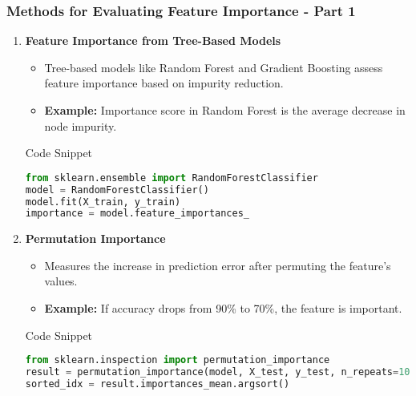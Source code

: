 \documentclass[aspectratio=169]{beamer}
\begin{document}
\begin{frame}
    \frametitle{Methods for Evaluating Feature Importance - Part 1}
    \begin{enumerate}
        \item \textbf{Feature Importance from Tree-Based Models}
        \begin{itemize}
            \item Tree-based models like Random Forest and Gradient Boosting assess feature importance based on impurity reduction.
            \item \textbf{Example:} Importance score in Random Forest is the average decrease in node impurity.
        \end{itemize}
        \begin{block}{Code Snippet}
            \begin{lstlisting}[language=Python]
from sklearn.ensemble import RandomForestClassifier
model = RandomForestClassifier()
model.fit(X_train, y_train)
importance = model.feature_importances_
            \end{lstlisting}
        \end{block}

        \item \textbf{Permutation Importance}
        \begin{itemize}
            \item Measures the increase in prediction error after permuting the feature's values.
            \item \textbf{Example:} If accuracy drops from 90\% to 70\%, the feature is important.
        \end{itemize}
        \begin{block}{Code Snippet}
            \begin{lstlisting}[language=Python]
from sklearn.inspection import permutation_importance
result = permutation_importance(model, X_test, y_test, n_repeats=10)
sorted_idx = result.importances_mean.argsort()
            \end{lstlisting}
        \end{block}
    \end{enumerate}
\end{frame}
\end{document}
